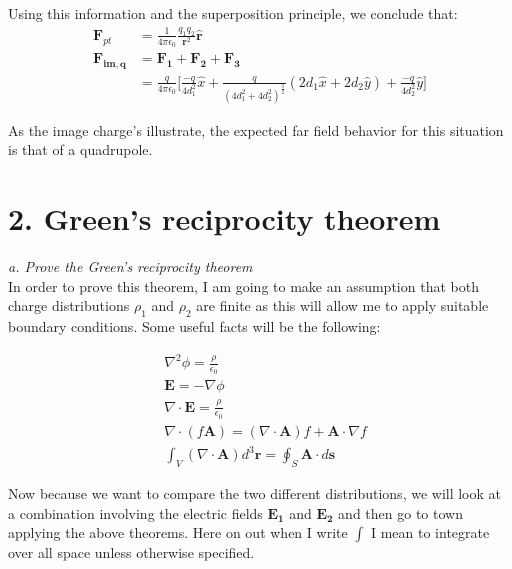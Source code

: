 \documentclass[a4paper, 11pt]{article}
\begin{document}
Using this information and the superposition principle, we conclude that: 
	\begin{align*}
		\mathbf{F}_{pt} &= \frac{1}{4\pi\epsilon_0}\frac{q_1q_2}{\mathbf{r}^2}\hat{\mathbf{r}} \\
		\mathbf{F_{im,q}} &= \mathbf{F_1} + \mathbf{F_2} + \mathbf{F_3} \\ 
		&= \frac{q}{4\pi\epsilon_0} \Bigg\lbrack \frac{-q}{4d_1^2}\hat{x} + \frac{q}{(4d_1^2 + 4d_2^2)^{\frac{3}{2}}}\left(2d_1 \hat{x} + 2d_2 \hat{y} \right) + \frac{-q}{4d_2^2}\hat{y} \Bigg\rbrack
	\end{align*}

As the image charge's illustrate, the expected far field behavior for this situation is that of a quadrupole. \\
\section*{2. Green's reciprocity theorem}
\textit{a. Prove the Green's reciprocity theorem} \\

In order to prove this theorem, I am going to make an assumption that both charge distributions $\rho_1$ and $\rho_2$ are finite as this will allow me to apply suitable boundary conditions. Some useful facts will be the following: 

\begin{align}
	&\nabla^2 \phi = \frac{\rho}{\epsilon_0} \\ 
	&\mathbf{E} = -\nabla \phi \\ 
	&\nabla \cdot \mathbf{E} = \frac{\rho}{\epsilon_0} \\ 
	&\nabla \cdot (f\mathbf{A}) = (\nabla \cdot \mathbf{A})f + \mathbf{A} \cdot \nabla f \\
	&\int_V (\nabla \cdot \mathbf{A})d^3\mathbf{r} = \oint_S \mathbf{A} \cdot d\mathbf{s} 
\end{align}

Now because we want to compare the two different distributions, we will look at a combination involving the electric fields $\mathbf{E_1}$ and $\mathbf{E_2}$ and then go to town applying the above theorems. Here on out when I write $\int$ I mean to integrate over all space unless otherwise specified.
\end{document}
